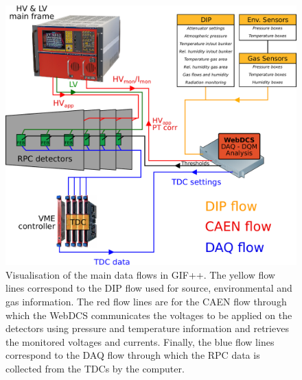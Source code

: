 	\begin{figure}[H]
        \centering
		\includegraphics[width = \plotwidth]{fig/chapt5/GIFpp-setup.pdf}
		\caption{\label{fig:dataflow} Visualisation of the main data flows in GIF++. The yellow flow lines correspond to the DIP flow used for source, environmental and gas information. The red flow lines are for the CAEN flow through which the WebDCS communicates the voltages to be applied on the detectors using pressure and temperature information and retrieves the monitored voltages and currents. Finally, the blue flow lines correspond to the DAQ flow through which the RPC data is collected from the TDCs by the computer.}
	\end{figure}
	
